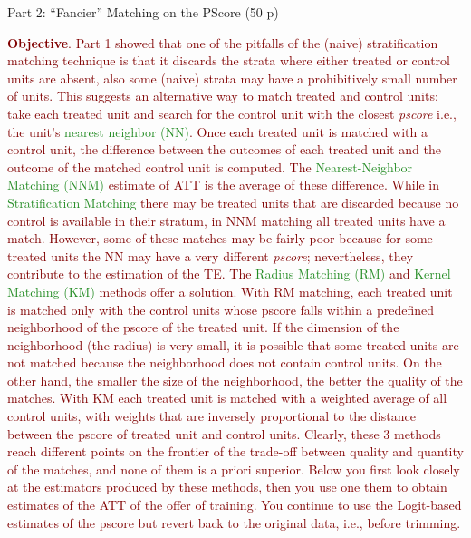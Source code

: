 \documentclass{article}
\begin{document}

\begin{center}
{\LARGE Part 2: ``Fancier'' Matching on the PScore (50 p)}
\end{center}

\noindent \textcolor{Maroon}{\textbf{Objective}. Part 1 showed that one of the pitfalls of the (naive) stratification matching technique is that it discards the strata where either treated or control units are absent, also some (naive) strata may have a prohibitively small number of units. This suggests an alternative way to match treated and control units: take each treated unit and search for the control unit with the closest \textit{pscore} i.e., the unit's \textcolor{ForestGreen}{nearest neighbor (NN)}. Once each treated unit is matched with a control unit, the difference between the outcomes of each treated unit and the outcome of the matched control unit is computed. The \textcolor{ForestGreen}{Nearest-Neighbor Matching (NNM)} estimate of ATT is the average of these difference. While in \textcolor{ForestGreen}{Stratification Matching} there may be treated units that are discarded because no control is available in their stratum, in NNM matching all treated units have a match. However, some of these matches may be fairly poor because for some treated units the NN may have a very different \textit{pscore}; nevertheless, they contribute to the estimation of the TE. The \textcolor{ForestGreen}{Radius Matching (RM)} and \textcolor{ForestGreen}{Kernel Matching (KM)} methods offer a solution. With RM matching, each treated unit is matched only with the control units whose pscore falls within a predefined neighborhood of the pscore of the treated unit. If the dimension of the neighborhood (the radius) is very small, it is possible that some treated units are not matched because the neighborhood does not contain control units. On the other hand, the smaller the size of the neighborhood, the better the quality of the matches. With KM each treated unit is matched with a weighted average of all control units, with weights that are inversely proportional to the distance between the pscore of treated unit and control units. Clearly, these 3 methods reach different points on the frontier of the trade-off between quality and quantity of the matches, and none of them is a priori superior. Below you first look closely at the estimators produced by these methods, then you use one them to obtain estimates of the ATT of the offer of training. You continue to use the Logit-based estimates of the pscore but revert back to the original data, i.e., before trimming.}\\
\end{document}
